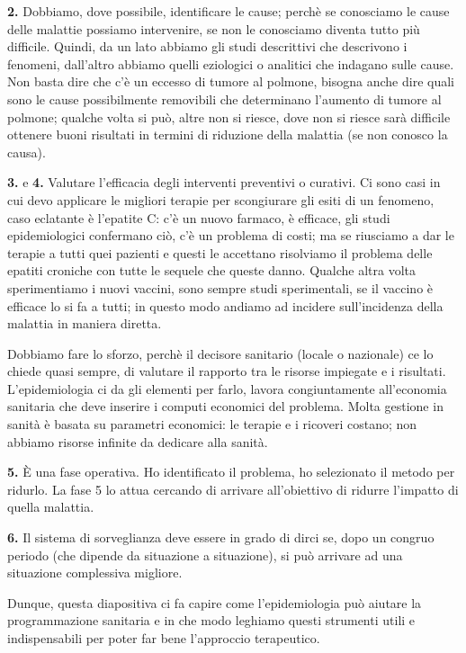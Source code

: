 \textbf{2.} Dobbiamo, dove possibile, identificare le cause; perchè se
conosciamo le cause delle malattie possiamo intervenire, se non le
conosciamo diventa tutto più difficile. Quindi, da un lato abbiamo gli
studi descrittivi che descrivono i fenomeni, dall'altro abbiamo quelli
eziologici o analitici che indagano sulle cause. Non basta dire che c'è
un eccesso di tumore al polmone, bisogna anche dire quali sono le cause
possibilmente removibili che determinano l'aumento di tumore al polmone;
qualche volta si può, altre non si riesce, dove non si riesce sarà
difficile ottenere buoni risultati in termini di riduzione della
malattia (se non conosco la causa).

\textbf{3.} e \textbf{4.} Valutare l'efficacia degli interventi
preventivi o curativi. Ci sono casi in cui devo applicare le migliori
terapie per scongiurare gli esiti di un fenomeno, caso eclatante è
l'epatite C: c'è un nuovo farmaco, è efficace, gli studi epidemiologici
confermano ciò, c'è un problema di costi; ma se riusciamo a dar le
terapie a tutti quei pazienti e questi le accettano risolviamo il
problema delle epatiti croniche con tutte le sequele che queste danno.
Qualche altra volta sperimentiamo i nuovi vaccini, sono sempre studi
sperimentali, se il vaccino è efficace lo si fa a tutti; in questo modo
andiamo ad incidere sull'incidenza della malattia in maniera diretta.

Dobbiamo fare lo sforzo, perchè il decisore sanitario (locale o
nazionale) ce lo chiede quasi sempre, di valutare il rapporto tra le
risorse impiegate e i risultati. L'epidemiologia ci da gli elementi per
farlo, lavora congiuntamente all'economia sanitaria che deve inserire i
computi economici del problema. Molta gestione in sanità è basata su
parametri economici: le terapie e i ricoveri costano; non abbiamo
risorse infinite da dedicare alla sanità.

\textbf{5.} È una fase operativa. Ho identificato il problema, ho
selezionato il metodo per ridurlo. La fase 5 lo attua cercando di
arrivare all'obiettivo di ridurre l'impatto di quella malattia.

\textbf{6.} Il sistema di sorveglianza deve essere in grado di dirci se,
dopo un congruo periodo (che dipende da situazione a situazione), si può
arrivare ad una situazione complessiva migliore.

Dunque, questa diapositiva ci fa capire come l'epidemiologia può aiutare
la programmazione sanitaria e in che modo leghiamo questi strumenti
utili e indispensabili per poter far bene l'approccio terapeutico.


